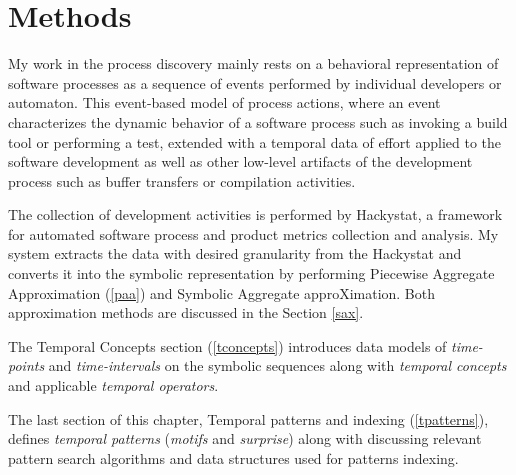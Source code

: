 \chapter{Methods}
My work in the process discovery mainly rests on a behavioral representation of software processes as a sequence of events performed by individual developers or automaton. This event-based model of process actions, where an event characterizes the dynamic behavior of a software process such as invoking a build tool or performing a test, extended with a temporal data of effort applied to the software development as well as other low-level artifacts of the development process such as buffer transfers or compilation activities. 

The collection of development activities is performed by Hackystat, a framework for automated software process and product metrics collection and analysis. My system extracts the data with desired granularity from the Hackystat and converts it into the symbolic representation by performing Piecewise Aggregate Approximation (\ref{paa}) and Symbolic Aggregate approXimation.  Both approximation methods are discussed in the Section \ref{sax}.

The Temporal Concepts section (\ref{tconcepts}) introduces data models of \textit{time-points} and \textit{time-intervals} on the symbolic sequences along with \textit{temporal concepts} and applicable \textit{temporal operators}. 

The last section of this chapter, Temporal patterns  and indexing (\ref{tpatterns}), defines \textit{temporal patterns} (\textit{motifs} and \textit{surprise}) along with discussing relevant pattern search algorithms and data structures used for patterns indexing.